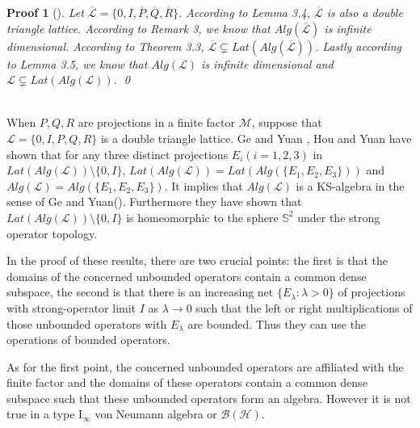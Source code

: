 \documentclass{jaums}
\theoremstyle{thmit} %
\theoremstyle{thmrm} %
\newtheorem*{oldproof}{Proof}
\renewenvironment{proof}[1][{}]{\begin{oldproof}[#1]}{\qed\end{oldproof}}
\begin{document}
\begin{proof}
        Let
$\overline{\mathcal{L}}=\{0,I,\overline{P},\overline{Q},\overline{R}\}$.
According to Lemma 3.4, $\overline{\mathcal{L}}$ is also a double triangle
lattice. According to Remark 3, we know that $Alg(\overline{\mathcal{L}})$ is
infinite dimensional. According to Theorem 3.3,
$\overline{\mathcal{L}}\varsubsetneq Lat(Alg(\overline{\mathcal{L}}))$.
Lastly according to Lemma 3.5, we know that $Alg(\mathcal{L})$ is infinite
dimensional and $\mathcal{L}\varsubsetneq
Lat(Alg(\mathcal{L}))$.
\end{proof}\\



When $P,Q,R$ are projections in a finite factor $\mathcal{M}$, suppose that
$\mathcal{L}=\{0,I,P,Q,R\}$ is a double triangle lattice.
Ge and Yuan {\cite{[GY2]}}, Hou and Yuan {\cite{[HY]}} have shown that for any
three distinct projections $E_i(i=1,2,3)$
in $Lat(Alg(\mathcal{L}))\setminus\{0,I\}$,
$Lat(Alg(\mathcal{L}))=Lat(Alg(\{E_1,E_2,E_3\}))$ and
$Alg(\mathcal{L})=Alg(\{E_1,E_2,E_3\})$. It implies that
$Alg(\mathcal{L})$ is a KS-algebra in the sense of Ge and
Yuan(\cite{[GY]}\cite{[GY2]}). Furthermore they have shown that
$Lat(Alg(\mathcal{L}))\setminus\{0,I\}$ is homeomorphic to the sphere
$\mathbb{S}^2$ under the strong operator topology.

In the proof of these results, there are two crucial points: the first is that
the domains of the concerned unbounded operators contain a
common dense subspace, the second is that there is
 an increasing net $\{E_{\lambda}:\lambda>0\}$ of projections with
strong-operator
limit $I$ as $\lambda\rightarrow 0$ such that the left or right multiplications 
of those unbounded operators with $E_{\lambda}$ are bounded. Thus
they can use the operations of bounded operators.

As for the first point, the concerned unbounded operators are affiliated with
the finite factor and
the domains of these operators contain a common dense subspace such that
these unbounded operators form an algebra. However it is not true in a type
$\mathrm{I}_{\infty}$ von Neumann algebra or $\mathcal {B}(\mathcal {H})$.
\end{document}
